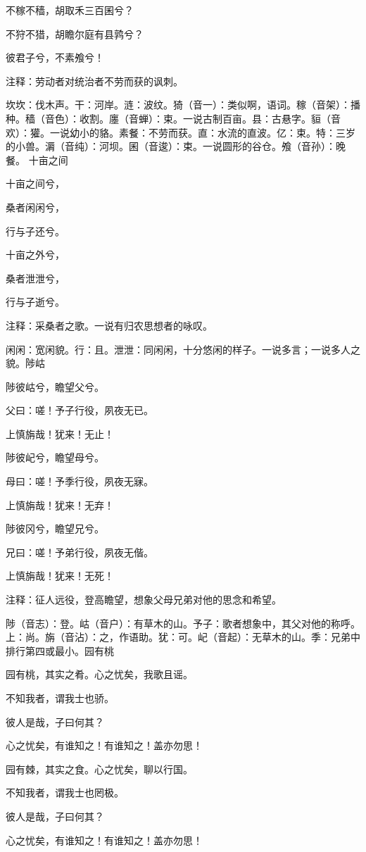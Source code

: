 \documentclass[12pt,UTF8]{ctexbook}
\begin{document}
不稼不穑，胡取禾三百囷兮？

不狩不猎，胡瞻尔庭有县鹑兮？

彼君子兮，不素飧兮！

注释：劳动者对统治者不劳而获的讽刺。

坎坎：伐木声。干：河岸。涟：波纹。猗（音一）：类似啊，语词。稼（音架）：播种。穑（音色）：收割。廛（音蝉）：束。一说古制百亩。县：古悬字。貆（音欢）：獾。一说幼小的貉。素餐：不劳而获。直：水流的直波。亿：束。特：三岁的小兽。漘（音纯）：河坝。囷（音逡）：束。一说圆形的谷仓。飧（音孙）：晚餐。 十亩之间

十亩之间兮，

桑者闲闲兮，

行与子还兮。

十亩之外兮，

桑者泄泄兮，

行与子逝兮。

注释：采桑者之歌。一说有归农思想者的咏叹。

闲闲：宽闲貌。行：且。泄泄：同闲闲，十分悠闲的样子。一说多言；一说多人之貌。陟岵

陟彼岵兮，瞻望父兮。

父曰：嗟！予子行役，夙夜无已。

上慎旃哉！犹来！无止！

陟彼屺兮，瞻望母兮。

母曰：嗟！予季行役，夙夜无寐。

上慎旃哉！犹来！无弃！

陟彼冈兮，瞻望兄兮。

兄曰：嗟！予弟行役，夙夜无偕。

上慎旃哉！犹来！无死！

注释：征人远役，登高瞻望，想象父母兄弟对他的思念和希望。

陟（音志）：登。岵（音户）：有草木的山。予子：歌者想象中，其父对他的称呼。上：尚。旃（音沾）：之，作语助。犹：可。屺（音起）：无草木的山。季：兄弟中排行第四或最小。园有桃

园有桃，其实之肴。心之忧矣，我歌且谣。

不知我者，谓我士也骄。

彼人是哉，子曰何其？

心之忧矣，有谁知之！有谁知之！盖亦勿思！

园有棘，其实之食。心之忧矣，聊以行国。

不知我者，谓我士也罔极。

彼人是哉，子曰何其？

心之忧矣，有谁知之！有谁知之！盖亦勿思！
\end{document}
